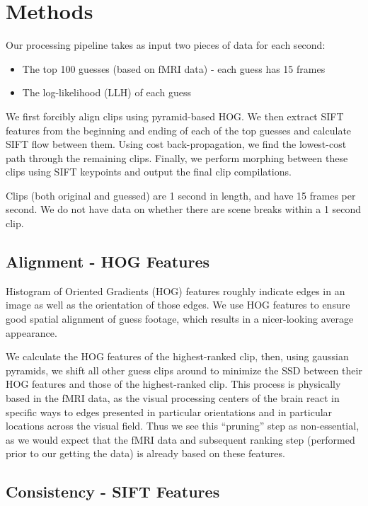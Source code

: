 
\section{Methods}

Our processing pipeline takes as input two pieces of data for each second:

\begin{itemize}
\item The top 100 guesses (based on fMRI data) - each guess has 15 frames
\item The log-likelihood (LLH) of each guess
\end{itemize}

We first forcibly align clips using pyramid-based HOG.  We then extract SIFT features from the beginning and ending of each of the top guesses and calculate SIFT flow between them.  Using cost back-propagation, we find the lowest-cost path through the remaining clips.  Finally, we perform morphing between these clips using SIFT keypoints and output the final clip compilations.

Clips (both original and guessed) are 1 second in length, and have 15 frames per second.  We do not have data on whether there are scene breaks within a 1 second clip.  

\subsection{Alignment - HOG Features}

Histogram of Oriented Gradients (HOG) features roughly indicate edges in an image as well as the orientation of those edges.  We use HOG features to ensure good spatial alignment of guess footage, which results in a nicer-looking average appearance.

We calculate the HOG features of the highest-ranked clip, then, using gaussian pyramids, we shift all other guess clips around to minimize the SSD between their HOG features and those of the highest-ranked clip.  This process is physically based in the fMRI data, as the visual processing centers of the brain react in specific ways to edges presented in particular orientations and in particular locations across the visual field.  Thus we see this ``pruning'' step as non-essential, as we would expect that the fMRI data and subsequent ranking step (performed prior to our getting the data) is already based on these features.

\subsection{Consistency - SIFT Features}


